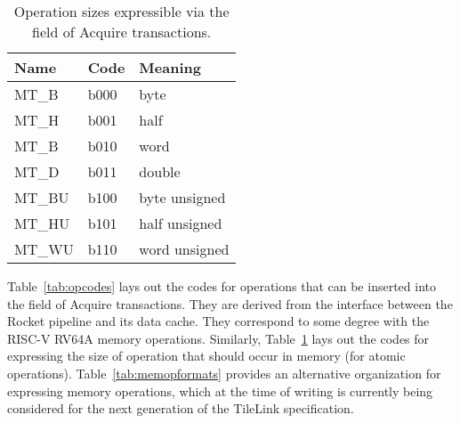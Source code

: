 \begin{table}
\centering
\begin{tabular}{|l|l|l|}
\hline
Name  & Code & Meaning \\ \hline \hline
MT\_B & b000 & byte \\ \hline
MT\_H & b001 & half \\ \hline
MT\_B & b010 & word \\ \hline
MT\_D & b011 & double \\ \hline
MT\_BU & b100 & byte unsigned \\ \hline
MT\_HU & b101 & half unsigned \\ \hline
MT\_WU & b110 & word unsigned \\ \hline
\end{tabular}
\caption{Operation sizes expressible via the  field of Acquire transactions.}
\label{tab:opsizes}
\end{table}

Table~\ref{tab:opcodes} lays out the codes for operations
that can be inserted into the  field of Acquire transactions.
They are derived from the interface between the Rocket pipeline and its data cache.
They correspond to some degree with the RISC-V RV64A memory operations.
Similarly, Table~\ref{tab:opsizes} lays out the codes for expressing the size of operation
that should occur in memory (for atomic operations).
Table~\ref{tab:memopformats} provides an alternative organization for expressing memory operations,
which at the time of writing is currently being considered
for the next generation of the TileLink specification.

